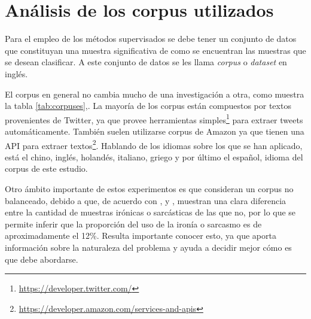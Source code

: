 \section{Análisis de los corpus utilizados}

\par Para el empleo de los métodos supervisados se debe tener un conjunto de datos que constituyan una muestra significativa de como se encuentran las muestras que se desean clasificar. A este conjunto de datos se les llama \textit{corpus} o \textit{dataset} en inglés.

\par El corpus en general no cambia mucho de una investigación a otra, como muestra la tabla \ref{tab:corpuses},. La mayoría de los corpus están compuestos por textos provenientes de Twitter, ya que provee herramientas simples\footnote{\url{https://developer.twitter.com/}} para extraer tweets automáticamente. También suelen utilizarse corpus de Amazon ya que tienen una \gls{API} para extraer textos\footnote{ \url{https://developer.amazon.com/services-and-apis}}. Hablando de los idiomas sobre los que se han aplicado, está el chino, inglés, holandés, italiano, griego y por último el español, idioma del corpus de este estudio.

\par Otro ámbito importante de estos experimentos es que consideran un corpus no balanceado, debido a que, de acuerdo con \textcite{reyes2012making}, \textcite{lopez2016character} y \textcite{barbieri2014italian}, muestran una clara diferencia entre la cantidad de muestras irónicas o sarcásticas de las que no, por lo que se permite inferir que la proporción del uso de la ironía o sarcasmo es de aproximadamente el 12\%. Resulta importante conocer esto, ya que aporta información sobre la naturaleza del problema y ayuda a decidir mejor cómo es que debe abordarse.

